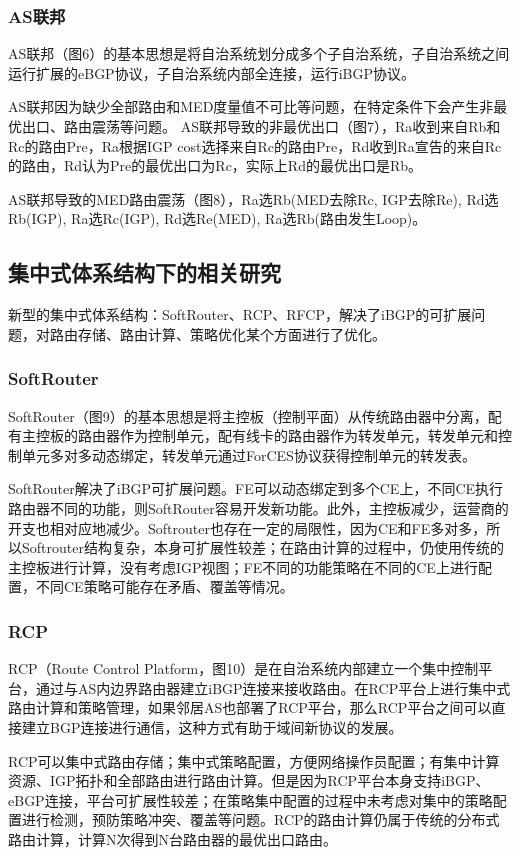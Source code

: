 \subsubsection{AS联邦}
AS联邦（图6）的基本思想是将自治系统划分成多个子自治系统，子自治系统之间运行扩展的eBGP协议，子自治系统内部全连接，运行iBGP协议。

AS联邦因为缺少全部路由和MED度量值不可比等问题，在特定条件下会产生非最优出口、路由震荡等问题。
AS联邦导致的非最优出口（图7），Ra收到来自Rb和Rc的路由Pre，Ra根据IGP cost选择来自Rc的路由Pre，Rd收到Ra宣告的来自Rc的路由，Rd认为Pre的最优出口为Rc，实际上Rd的最优出口是Rb。

AS联邦导致的MED路由震荡（图8），Ra选Rb(MED去除Rc, IGP去除Re), Rd选Rb(IGP), Ra选Rc(IGP), Rd选Re(MED), Ra选Rb(路由发生Loop)。

\subsection{集中式体系结构下的相关研究}
新型的集中式体系结构：SoftRouter、RCP、RFCP，解决了iBGP的可扩展问题，对路由存储、路由计算、策略优化某个方面进行了优化。
\subsubsection{SoftRouter}
SoftRouter（图9）的基本思想是将主控板（控制平面）从传统路由器中分离，配有主控板的路由器作为控制单元，配有线卡的路由器作为转发单元，转发单元和控制单元多对多动态绑定，转发单元通过ForCES协议获得控制单元的转发表。

SoftRouter解决了iBGP可扩展问题。FE可以动态绑定到多个CE上，不同CE执行路由器不同的功能，则SoftRouter容易开发新功能。此外，主控板减少，运营商的开支也相对应地减少。Softrouter也存在一定的局限性，因为CE和FE多对多，所以Softrouter结构复杂，本身可扩展性较差；在路由计算的过程中，仍使用传统的主控板进行计算，没有考虑IGP视图；FE不同的功能策略在不同的CE上进行配置，不同CE策略可能存在矛盾、覆盖等情况。

\subsubsection{RCP}
RCP（Route Control Platform，图10）是在自治系统内部建立一个集中控制平台，通过与AS内边界路由器建立iBGP连接来接收路由。在RCP平台上进行集中式路由计算和策略管理，如果邻居AS也部署了RCP平台，那么RCP平台之间可以直接建立BGP连接进行通信，这种方式有助于域间新协议的发展。

RCP可以集中式路由存储；集中式策略配置，方便网络操作员配置；有集中计算资源、IGP拓扑和全部路由进行路由计算。但是因为RCP平台本身支持iBGP、eBGP连接，平台可扩展性较差；在策略集中配置的过程中未考虑对集中的策略配置进行检测，预防策略冲突、覆盖等问题。RCP的路由计算仍属于传统的分布式路由计算，计算N次得到N台路由器的最优出口路由。

